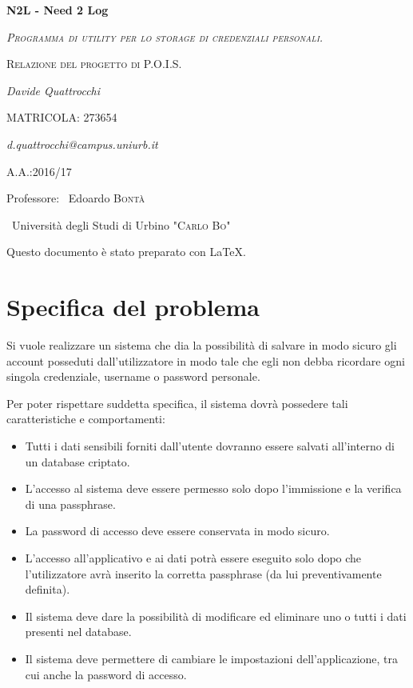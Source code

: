 \documentclass[a4paper,10pt]{report} %
\begin{document}
\begin{titlepage}%
	\centering
	\vfill
	{\huge\bfseries N2L - Need 2 Log\par}
  \vspace{1cm}
  {\scshape\large\itshape Programma di utility per lo storage di credenziali personali.\par}
	\vspace{0.5cm}
  {\scshape\large Relazione del progetto di P.O.I.S.\par}
	\vspace{2cm}
	{\Large\itshape Davide Quattrocchi\par}
  {\large MATRICOLA: 273654\par}
	{\itshape d.quattrocchi@campus.uniurb.it\par}
	\vfill
  {\large A.A.:2016/17\par}
	\vspace{0.2cm}
	Professore: ~Edoardo \textsc{Bontà}\par
	\vspace{1.0cm}
	~Università degli Studi di Urbino \textsc{"Carlo Bo"}\par
	\vfill
  \vspace{0.5cm}
  Questo documento è stato preparato con \LaTeX.
  \end{titlepage}
\newpage
\tableofcontents %
\newpage
\chapter{Specifica del problema} %
		Si vuole realizzare un sistema che dia la possibilità di salvare in modo sicuro
			gli account posseduti dall'utilizzatore in modo tale che egli non debba ricordare
			ogni singola credenziale, username o password personale.

		Per poter rispettare suddetta specifica, il sistema dovrà possedere tali
		 	caratteristiche e comportamenti:
		\begin{itemize}
			\item Tutti i dati sensibili forniti dall'utente dovranno essere salvati
				all'interno di un database criptato.
			\item L'accesso al sistema deve essere permesso solo dopo l'immissione e la
				verifica di una passphrase.
			\item La password di accesso deve essere conservata in modo sicuro.
			\item L'accesso all'applicativo e ai dati potrà essere eseguito solo dopo che
				l'utilizzatore avrà inserito la corretta passphrase (da lui preventivamente
				definita).
			\item Il sistema deve dare la possibilità di modificare ed eliminare uno o
				tutti i dati presenti nel database.
			\item Il sistema deve permettere di cambiare le impostazioni dell'applicazione,
				tra cui anche la password di accesso.
			\end{itemize}
\newpage
\end{document}
